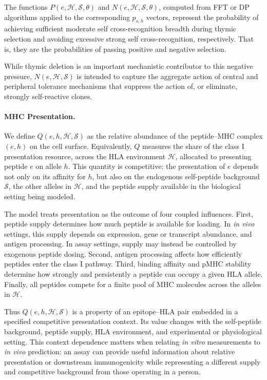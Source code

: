 \documentclass[11pt]{article}
\begin{document}
The functions \(P(e,\mathcal{H},\mathcal{S}, \theta)\) and \(N(e,\mathcal{H},\mathcal{S}, \theta)\), computed from FFT or DP algorithms applied to the corresponding $p_{s,h}$ vectors, represent the probability of achieving sufficient moderate self cross-recognition breadth during thymic selection and avoiding excessive strong self cross-recognition, respectively. That is, they are the probabilities of passing positive and negative selection.

While thymic deletion is an important mechanistic contributor to this negative pressure, \(N(e,\mathcal{H},\mathcal{S})\) is intended to capture the aggregate action of central and peripheral tolerance mechanisms that suppress the action of, or eliminate, strongly self-reactive clones.




\paragraph{MHC Presentation.}
We define \(Q(e,h,\mathcal{H},\mathcal{S})\) as the relative abundance of the peptide--MHC complex \((e,h)\) on the cell surface. Equivalently, \(Q\) measures the share of the class I presentation resource, across the HLA environment \(\mathcal{H}\), allocated to presenting peptide \(e\) on allele \(h\). This quantity is competitive: the presentation of \(e\) depends not only on its affinity for \(h\), but also on the endogenous self-peptide background \(\mathcal{S}\), the other alleles in \(\mathcal{H}\), and the peptide supply available in the biological setting being modeled.

The model treats presentation as the outcome of four coupled influences. First, peptide supply determines how much peptide is available for loading. In \textit{in vivo} settings, this supply depends on expression, gene or transcript abundance, and antigen processing. In assay settings, supply may instead be controlled by exogenous peptide dosing. Second, antigen processing affects how efficiently peptides enter the class I pathway. Third, binding affinity and pMHC stability determine how strongly and persistently a peptide can occupy a given HLA allele. Finally, all peptides compete for a finite pool of MHC molecules across the alleles in \(\mathcal{H}\).

Thus \(Q(e,h,\mathcal{H},\mathcal{S})\) is a property of an epitope--HLA pair
embedded in a specified competitive presentation context. Its value changes
with the self-peptide background, peptide supply, HLA environment, and
experimental or physiological setting. This context dependence matters when
relating \textit{in vitro} measurements to \textit{in vivo} prediction: an assay
can provide useful information about relative presentation or downstream
immunogenicity while representing a different supply and competitive
background from those operating in a person.
\end{document}
